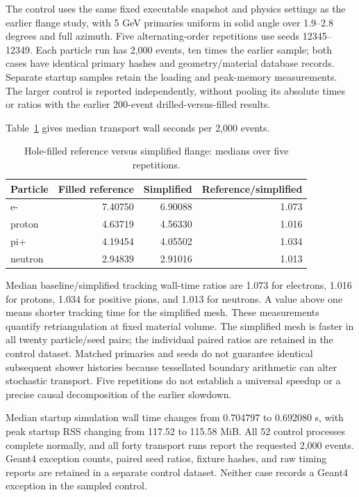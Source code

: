 The control uses the same fixed executable snapshot and physics settings as the earlier flange study, with 5
GeV primaries uniform in solid angle over 1.9--2.8 degrees and full azimuth. Five alternating-order
repetitions use seeds 12345--12349. Each particle run has 2,000 events, ten times the earlier sample; both
cases have identical primary hashes and geometry/material database records. Separate startup samples retain
the loading and peak-memory measurements. The larger control is reported independently, without pooling its
absolute times or ratios with the earlier 200-event drilled-versus-filled results.

Table~\ref{tab:outer-flange-control} gives median transport wall seconds per 2,000 events.

\begin{table}[htbp]
\centering
\caption{Hole-filled reference versus simplified flange: medians over five repetitions.}
\label{tab:outer-flange-control}
\begin{tabular}{lrrr}
\toprule
Particle & Filled reference & Simplified & Reference/simplified \\
\midrule
e- & 7.40750 & 6.90088 & 1.073 \\
proton & 4.63719 & 4.56330 & 1.016 \\
pi+ & 4.19454 & 4.05502 & 1.034 \\
neutron & 2.94839 & 2.91016 & 1.013 \\
\bottomrule
\end{tabular}
\end{table}

Median baseline/simplified tracking wall-time ratios are 1.073 for electrons, 1.016 for protons, 1.034 for
positive pions, and 1.013 for neutrons. A value above one means shorter tracking time for the simplified
mesh. These measurements quantify retriangulation at fixed material volume. The simplified mesh is faster in
all twenty particle/seed pairs; the individual paired ratios are retained in the control dataset. Matched
primaries and seeds do not guarantee identical subsequent shower histories because tessellated boundary
arithmetic can alter stochastic transport. Five repetitions do not establish a universal speedup or a
precise causal decomposition of the earlier slowdown.

Median startup simulation wall time changes from 0.704797 to 0.692080 s, with peak startup RSS changing from
117.52 to 115.58 MiB. All 52 control processes complete normally, and all forty transport runs report the
requested 2,000 events. Geant4 exception counts, paired seed ratios, fixture hashes, and raw timing reports
are retained in a separate control dataset. Neither case records a Geant4 exception in the sampled control.

